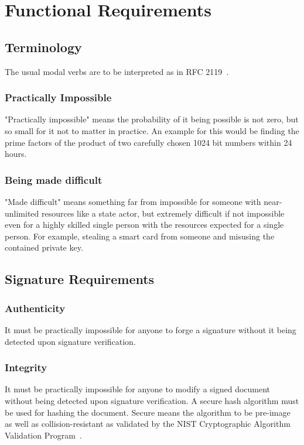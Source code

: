 \chapter{Functional Requirements}
\label{ch:functionalrequirements}

\section{Terminology}

The usual modal verbs are to be interpreted as in RFC 2119~\cite{rfc2119}.

\subsection{Practically Impossible}
"Practically impossible" means the probability of it being possible is not zero, but so small for it not to matter in practice.
An example for this would be finding the prime factors of the product of two carefully chosen 1024 bit numbers within 24 hours.

\subsection{Being made difficult}
"Made difficult" means something far from impossible for someone with near-unlimited resources like a state actor,
but extremely difficult if not impossible even for a highly skilled single person with the resources expected for a single person.
For example, stealing a smart card from someone and misusing the contained private key.

\section{Signature Requirements}
\label{sec:signaturerequirements}
\subsection{Authenticity}
\label{subsec:authenticity}
It must be practically impossible for anyone to forge a signature without it being detected upon signature verification.

\subsection{Integrity}\label{subsec:integrity}
It must be practically impossible for anyone to modify a signed document without being detected upon signature verification.
A secure hash algorithm must be used for hashing the document.
Secure means the algorithm to be pre-image as well as collision-resistant as validated by the \gls{NIST} Cryptographic Algorithm Validation Program~\cite{nistcavp}.

